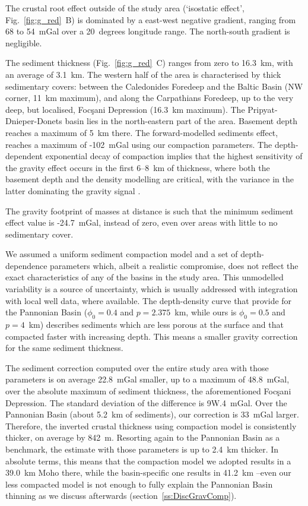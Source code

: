 {The crustal root effect outside of the study area (`isostatic effect', Fig.~\ref{fig:g_red}~B) is dominated by a east-west negative gradient, ranging from 68 to 54~mGal over a 20~degrees longitude range.
The north-south gradient is negligible.

The sediment thickness (Fig.~\ref{fig:g_red}~C) ranges from zero to 16.3~km, with an average of 3.1~km.
The western half of the area is characterised by thick sedimentary covers: between the Caledonides Foredeep and the Baltic Basin (NW corner, 11~km maximum), and along the Carpathians Foredeep, up to the very deep, but localised, Focşani Depression (16.3~km maximum).
The Pripyat-Dnieper-Donets basin lies in the north-eastern part of the area.
Basement depth reaches a maximum of 5~km there.
The forward-modelled sediments effect, reaches a maximum of -102~mGal using our compaction parameters.
The depth-dependent exponential decay of compaction implies that the highest sensitivity of the gravity effect occurs in the first 6--8~km of thickness, where both the basement depth and the density modelling are critical, with the variance in the latter dominating the gravity signal \parencite{Kaban2010}.

The gravity footprint of masses at distance is such that the minimum sediment effect value is -24.7~mGal, instead of zero, even over areas with little to no sedimentary cover.

We assumed a uniform sediment compaction model and a set of depth-dependence parameters which, albeit a realistic compromise, does not reflect the exact characteristics of any of the basins in the study area.
This unmodelled variability is a source of uncertainty, which is usually addressed with integration with local well data, where available.
The depth-density curve that \textcite{Kaban2010} provide for the Pannonian Basin ($\phi_0 = 0.4$ and $p = 2.375$~{km}, while ours is $\phi_0 = 0.5$ and $p = 4$~{km}) describes sediments which are less porous at the surface and that compacted faster with increasing depth.
This means a smaller gravity correction for the same sediment thickness.

The sediment correction computed over the entire study area with those parameters is on average 22.8~mGal smaller, up to a maximum of 48.8~mGal, over the absolute maximum of sediment thickness, the aforementioned Focşani Depression.
The standard deviation of the difference is 9W.4~mGal.
Over the Pannonian Basin (about 5.2~km of sediments), our correction is 33~mGal larger.
Therefore, the inverted crustal thickness using \textcite{Kaban2010} compaction model is consistently thicker, on average by 842~m.
Resorting again to the Pannonian Basin as a benchmark, the estimate with those parameters is up to 2.4~km thicker.
In absolute terms, this means that the compaction model we adopted results in a 39.0~km Moho there, while the basin-specific one results in 41.2~km --even our less compacted model is not enough to fully explain the Pannonian Basin thinning as we discuss afterwards (section~\ref{ss:DiscGravComp}).

}
